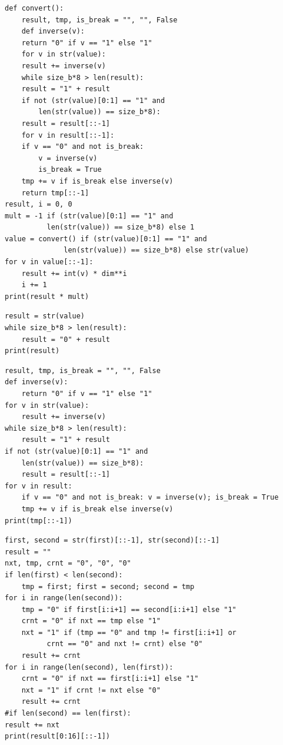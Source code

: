 \documentclass[11pt]{article}
\begin{document}
\vspace{2em}
\begin{lstlisting}
def convert():
    result, tmp, is_break = "", "", False
    def inverse(v):
	return "0" if v == "1" else "1"
    for v in str(value):
	result += inverse(v)
    while size_b*8 > len(result):
	result = "1" + result
    if not (str(value)[0:1] == "1" and
	    len(str(value)) == size_b*8):
	result = result[::-1]
    for v in result[::-1]:
	if v == "0" and not is_break:
	    v = inverse(v)
	    is_break = True
	tmp += v if is_break else inverse(v)
    return tmp[::-1]
result, i = 0, 0
mult = -1 if (str(value)[0:1] == "1" and
	      len(str(value)) == size_b*8) else 1
value = convert() if (str(value)[0:1] == "1" and
		      len(str(value)) == size_b*8) else str(value)
for v in value[::-1]:
    result += int(v) * dim**i
    i += 1
print(result * mult)
\end{lstlisting}
\vspace{2em}
\begin{lstlisting}
result = str(value)
while size_b*8 > len(result):
    result = "0" + result
print(result)
\end{lstlisting}
\vspace{2em}
\begin{lstlisting}
result, tmp, is_break = "", "", False
def inverse(v):
    return "0" if v == "1" else "1"
for v in str(value):
    result += inverse(v)
while size_b*8 > len(result):
    result = "1" + result
if not (str(value)[0:1] == "1" and
	len(str(value)) == size_b*8):
    result = result[::-1]
for v in result:
    if v == "0" and not is_break: v = inverse(v); is_break = True
    tmp += v if is_break else inverse(v)
print(tmp[::-1])
\end{lstlisting}
\vspace{2em}
\begin{lstlisting}
first, second = str(first)[::-1], str(second)[::-1]
result = ""
nxt, tmp, crnt = "0", "0", "0"
if len(first) < len(second):
    tmp = first; first = second; second = tmp
for i in range(len(second)):
    tmp = "0" if first[i:i+1] == second[i:i+1] else "1"
    crnt = "0" if nxt == tmp else "1"
    nxt = "1" if (tmp == "0" and tmp != first[i:i+1] or
		  crnt == "0" and nxt != crnt) else "0"
    result += crnt
for i in range(len(second), len(first)):
    crnt = "0" if nxt == first[i:i+1] else "1"
    nxt = "1" if crnt != nxt else "0"
    result += crnt
#if len(second) == len(first):
result += nxt
print(result[0:16][::-1])
\end{lstlisting}
\end{document}
